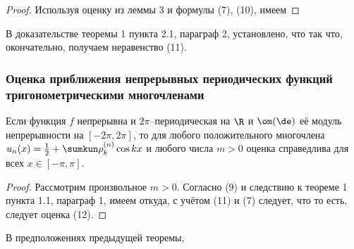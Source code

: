 \documentclass[a4paper]{article}
\newenvironment{imp*}{\par\vskip\theoremskip\textbf{Следствие.}\normalfont \itshape}{\par\vskip\theoremskip}
\begin{document}
\begin{proof}
Используя оценку из леммы 3 и формулы (7), (10), имеем
\end{proof}

В доказательстве теоремы 1 пункта 2.1, параграф 2, установлено, что
 так что, окончательно, получаем неравенство (11).

\subsubsection{Оценка приближения непрерывных периодических функций
тригонометрическими многочленами}

\begin{theorem}
Если функция $f$ непрерывна и $2\pi$--периодическая на $\R$ и
$\om(\de)$ её модуль непрерывности на $[-2\pi,2\pi]$, то для любого
положительного многочлена $u_n(x) = \frac12 + \sumkun \rho_k^{(n)}
\cos kx$ и любого числа $m>0$ оценка  справедлива для всех
$x\in[-\pi,\pi]$.
\end{theorem}

\begin{proof}
Рассмотрим произвольное $m>0$. Согласно (9) и следствию к теореме 1
пункта 1.1, параграф 1, имеем  откуда, с учётом (11) и (7) следует, что  то есть,
следует оценка (12).
\end{proof}

\begin{imp*}
В предположениях предыдущей теоремы, 
\end{imp*}
\end{document}
